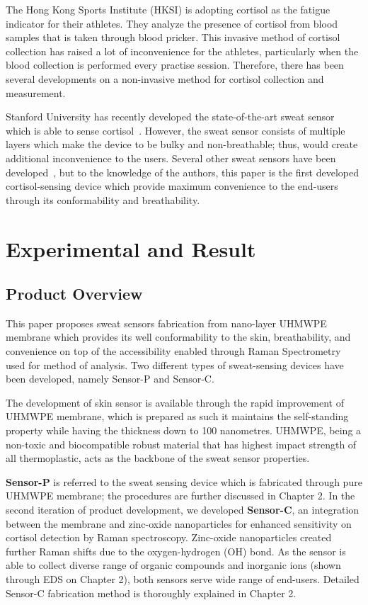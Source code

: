 \documentclass[journal]{IEEEtran}
\begin{document}
The Hong Kong Sports Institute (HKSI) is adopting cortisol as the fatigue indicator for their athletes. They analyze the presence of cortisol from blood samples that is taken through blood pricker. This invasive method of cortisol collection has raised a lot of inconvenience for the athletes, particularly when the blood collection is performed every practise session. Therefore, there has been several developments on a non-invasive method for cortisol collection and measurement.

Stanford University has recently developed the state-of-the-art sweat sensor which is able to sense cortisol~\cite{Parlak_membraneElectro}. However, the sweat sensor consists of multiple layers which make the device to be bulky and non-breathable; thus, would create additional inconvenience to the users. Several other sweat sensors have been developed~\cite{LabOnSkin}, but to the knowledge of the authors, this paper is the first developed cortisol-sensing device which provide maximum convenience to the end-users through its conformability and breathability.

\section{Experimental and Result}
\subsection{Product Overview}

This paper proposes sweat sensors fabrication from nano-layer UHMWPE membrane which provides its well conformability to the skin, breathability, and convenience on top of the accessibility enabled through Raman Spectrometry used for method of analysis. Two different types of sweat-sensing devices have been developed, namely Sensor-P and Sensor-C.

The development of skin sensor is available through the rapid improvement of UHMWPE membrane, which is prepared as such it maintains the self-standing property while having the thickness down to 100 nanometres. UHMWPE, being a non-toxic and biocompatible robust material that has highest impact strength of all thermoplastic, acts as the backbone of the sweat sensor properties.

\textbf{Sensor-P} is referred to the sweat sensing device which is fabricated through pure UHMWPE membrane; the procedures are further discussed in Chapter 2. In the second iteration of product development, we developed \textbf{Sensor-C}, an integration between the membrane and zinc-oxide nanoparticles for enhanced sensitivity on cortisol detection by Raman spectroscopy. Zinc-oxide nanoparticles created further Raman shifts due to the oxygen-hydrogen (OH) bond. As the sensor is able to collect diverse range of organic compounds and inorganic ions (shown through EDS on Chapter 2), both sensors serve wide range of end-users. Detailed Sensor-C fabrication method is thoroughly explained in Chapter 2.
\end{document}
